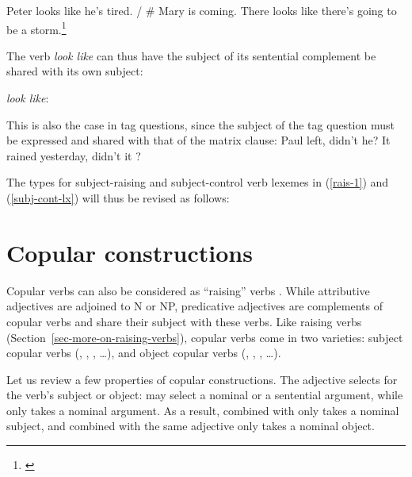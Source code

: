 \documentclass[output=paper
	        ,collection
	        ,collectionchapter
 	        ,biblatex
                ,babelshorthands
                ,newtxmath
                ,draftmode
                ,colorlinks, citecolor=brown
]{langscibook}
\begin{document}
\eal
\ex Peter looks like he's tired. / \# Mary is coming.
\ex There looks like there's going to be a storm.\footnote{
\citet[]{Sag2007a}
}
\zl

The verb \emph{look like} can thus have the subject of its sentential complement  be shared with its
own subject:

\ea
\emph{look like}:\\
\avm{
[ \argst < \1, S[xarg & \1] > ]}
\z

This is also the case in  tag questions, since the subject of the tag question must be
expressed and shared with that of the matrix clause:
\eal
\ex Paul left, didn't he?
\ex It rained yesterday, didn't it ?
\zl


The types for subject-raising and subject-control verb lexemes in (\ref{rais-1}) and (\ref{subj-cont-lx}) will thus be revised as follows:\\
\eal
\ex {}  \impl \avm{ [\argst \1 \+ < [x-arg & \1 ] > ] } 
\ex {} \impl {}
\zl

\section{Copular constructions}
\label{sec-copular-constructions}

Copular verbs can also be considered as ``raising'' verbs \citep[]{Chomsky81a}.  While
attributive adjectives are adjoined to N or NP, predicative adjectives are complements of copular
verbs and share their subject with these verbs. Like raising verbs
(Section~\ref{sec-more-on-raising-verbs}), copular verbs come in two varieties: subject copular
verbs (, , , \ldots), and object copular verbs (,
, , \ldots).

Let us review a few properties of copular constructions.
The adjective selects for the verb's subject or object:  may select a nominal or a
sentential argument, while  only takes a nominal argument. As a result, 
combined with  only takes a nominal subject, and  combined with the
same adjective only takes a nominal object. 
\end{document}
